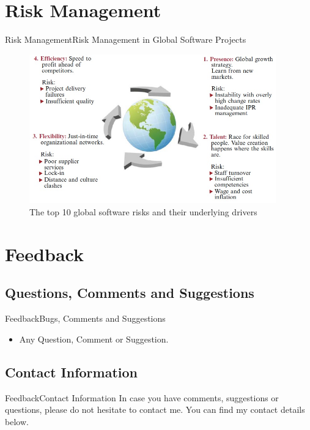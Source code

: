 \documentclass[10pt]{beamer}
\begin{document}
\section{Risk Management}
\begin{frame}{Risk Management}{Risk Management in Global Software Projects}  
	\begin{figure}[H] 
		\begin{flushleft}
			\includegraphics[width=0.95\textwidth]{./AAUgraphics/risk.jpg}
			\caption{The top 10 global software risks and their underlying drivers}
			\label{DCP}
		\end{flushleft}
	\end{figure}
\end{frame}

\section{Feedback}
\subsection{Questions, Comments and Suggestions}
\begin{frame}{Feedback}{Bugs, Comments and Suggestions}
  \begin{itemize}
    \item<1-> Any Question, Comment or Suggestion.
  \end{itemize}
\end{frame}

\subsection{Contact Information}
\begin{frame}{Feedback}{Contact Information}
In case you have comments, suggestions or questions, please do not hesitate to contact me. You can find my contact details below.
  \begin{center}
    \insertauthor\\
  \end{center}
\end{frame}
\end{document}
